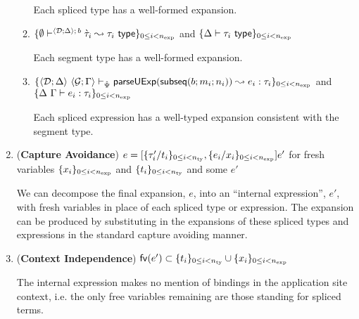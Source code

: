 \documentclass[acmsmall,screen]{acmart}
\begin{document}
\begin{theorem}
\begin{enumerate}[nolistsep,leftmargin=10pt,label={\arabic*.}]
\begin{enumerate}
\begin{grayparbox}
          Each spliced type has a well-formed expansion.
          \end{grayparbox}
  \item $\{
    \emptyset\vdash^{
      \langle \mathcal{D}; \Delta \rangle
        ;\,b
    } 
      \grave{\tau}_i
     \leadsto \tau_i~\mathsf{type}
  \}_{0 \leq i < n_\text{exp}}$ and $\{\Delta \vdash \tau_i~\mathsf{type}\}_{0 \leq i < n_\text{exp}}$
        \begin{grayparbox}
        Each segment type has a well-formed expansion.
        \end{grayparbox}
  \item $\{
    \langle \mathcal{D}; \Delta \rangle~\langle \mathcal{G}; \Gamma \rangle \vdash_{\hat{\Psi}} \mathsf{parseUExp}(\mathsf{subseq}(b; m_i; n_i)) \leadsto e_i : \tau_i
  \}_{0 \leq i < n_\text{exp}}$ and $\{\Delta~\Gamma \vdash e_i : \tau_i\}_{0 \leq i < n_\text{exp}}$\vspace{-5px}
        \begin{grayparbox}
        Each spliced expression has a well-typed expansion consistent with the segment type.
        \end{grayparbox}
\end{enumerate}
\item (\textbf{Capture Avoidance}) $e = [\{\tau'_i/t_i\}_{0 \leq i < n_\text{ty}}, \{e_i/x_i\}_{0 \leq i < n_\text{exp}}]e'$ for fresh variables $\{x_i\}_{0 \leq i < n_\text{exp}}$ and $\{t_i\}_{0 \leq i < n_\text{ty}}$ and some $e'$
    \begin{grayparbox}
      We can decompose the final expansion, $e$, into an ``internal expression'', $e'$, with fresh variables in place of each spliced type or expression. The expansion can be produced by substituting in the expansions of these spliced types and expressions in the standard capture avoiding manner.
    \end{grayparbox}
\item (\textbf{Context Independence}) $\mathsf{fv}(e') \subset \{t_i\}_{0 \leq i < n_\text{ty}} \cup \{x_i\}_{0 \leq i < n_\text{exp}}$
      \begin{grayparbox}
      The internal expression makes no mention of bindings in the application site context, i.e. the only free variables remaining are those standing for spliced terms.
      \end{grayparbox}
\end{enumerate}
\end{theorem}


\end{document}
